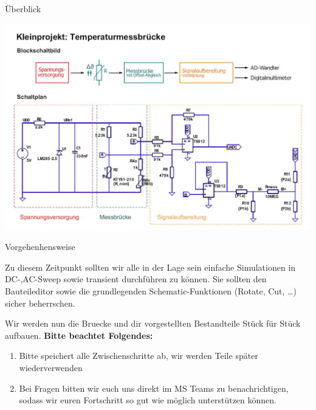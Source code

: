 \begin{frame}[t]{Überblick}

    \begin{spacing}{0.9} \begin{tiny}
            \begin{minipage}{\textwidth}
                \includegraphics[width=\linewidth]{pictures/projekt_overview.jpg}
            \end{minipage}
        \end{tiny} \end{spacing}

\end{frame}

\begin{frame}[t]{Vorgehenhensweise}

    Zu diesem Zeitpunkt sollten wir alle in der Lage sein einfache Simulationen in DC-,AC-Sweep sowie transient
    durchführen zu können. Sie sollten den Bauteileditor sowie die grundlegenden Schematic-Funktionen (Rotate, Cut, \dots)
    sicher beherrschen.

    Wir werden nun die Bruecke und dir vorgestellten Bestandteile Stück für Stück aufbauen.
    \textbf{Bitte beachtet Folgendes:}

    \begin{enumerate}
        \item Bitte speichert alle Zwischenschritte ab, wir werden Teile später wiederverwenden
        \item Bei Fragen bitten wir euch uns direkt im MS Teams zu benachrichtigen, sodass wir euren
              Fortschritt so gut wie möglich unterstützen können.
    \end{enumerate}
\end{frame}
